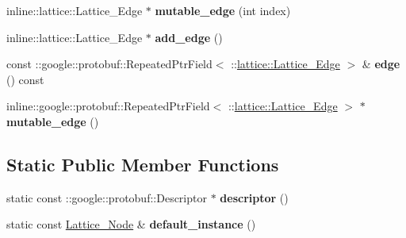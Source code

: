\begin{DoxyCompactItemize}
\item 
\hypertarget{classlattice_1_1Lattice__Node_acf217e32657e81c9923cbb99e12ce3ac}{
inline::lattice::Lattice\_\-Edge $\ast$ {\bfseries mutable\_\-edge} (int index)}
\label{classlattice_1_1Lattice__Node_acf217e32657e81c9923cbb99e12ce3ac}

\item 
\hypertarget{classlattice_1_1Lattice__Node_ac1458c47ea3591c2039a072a1168f76d}{
inline::lattice::Lattice\_\-Edge $\ast$ {\bfseries add\_\-edge} ()}
\label{classlattice_1_1Lattice__Node_ac1458c47ea3591c2039a072a1168f76d}

\item 
\hypertarget{classlattice_1_1Lattice__Node_a1a529655a726b6444615985888c4fad7}{
const ::google::protobuf::RepeatedPtrField$<$ ::\hyperlink{classlattice_1_1Lattice__Edge}{lattice::Lattice\_\-Edge} $>$ \& {\bfseries edge} () const }
\label{classlattice_1_1Lattice__Node_a1a529655a726b6444615985888c4fad7}

\item 
\hypertarget{classlattice_1_1Lattice__Node_afc586b8c22db1d283c6757d17d04fa8f}{
inline::google::protobuf::RepeatedPtrField$<$ ::\hyperlink{classlattice_1_1Lattice__Edge}{lattice::Lattice\_\-Edge} $>$ $\ast$ {\bfseries mutable\_\-edge} ()}
\label{classlattice_1_1Lattice__Node_afc586b8c22db1d283c6757d17d04fa8f}

\end{DoxyCompactItemize}
\subsection*{Static Public Member Functions}
\begin{DoxyCompactItemize}
\item 
\hypertarget{classlattice_1_1Lattice__Node_a5ef3fade0c137506969db1190b6cd83e}{
static const ::google::protobuf::Descriptor $\ast$ {\bfseries descriptor} ()}
\label{classlattice_1_1Lattice__Node_a5ef3fade0c137506969db1190b6cd83e}

\item 
\hypertarget{classlattice_1_1Lattice__Node_af8b99aa92e0e56691520baae0646fbc9}{
static const \hyperlink{classlattice_1_1Lattice__Node}{Lattice\_\-Node} \& {\bfseries default\_\-instance} ()}
\label{classlattice_1_1Lattice__Node_af8b99aa92e0e56691520baae0646fbc9}

\end{DoxyCompactItemize}

